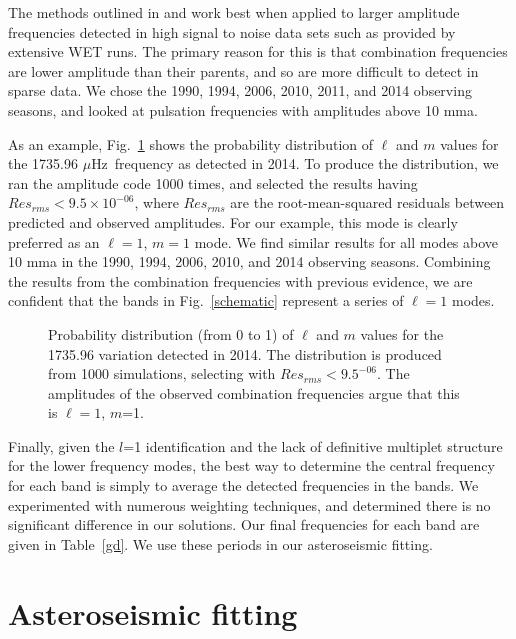 \documentclass[12pt,preprint]{aastex}
\newcommand{\muHz}{\mbox{$\mu$Hz}}
\begin{document}
The methods outlined in \citet{Provencal12} and \citet{Montgomery10} work best when applied to 
larger amplitude frequencies detected in high signal to noise data sets such as provided by 
extensive WET runs.  The primary reason for this is that combination frequencies are lower 
amplitude than their parents, and so are more difficult to detect in sparse data.  We chose 
the 1990, 1994, 2006, 2010, 2011, and 2014 observing seasons, and looked at pulsation 
frequencies with amplitudes above 10 mma.  

As an example, Fig.~\ref{modeamps} shows the probability distribution of $\ell$ and $m$ 
values for the 1735.96 \muHz\ frequency as detected in 2014. To produce the distribution, we ran
the amplitude code \citep{Montgomery10} 1000 times, and selected the results having $Res_{rms}<9.5\times10^{-06}$, 
where $Res_{rms}$ are the root-mean-squared residuals between predicted and observed amplitudes.  
For our example, this mode is clearly preferred as an $\ell=1$, $m=1$ mode. We find similar results for all
modes above 10 mma in the 1990, 1994, 2006, 2010, and 2014 observing seasons. Combining the results from the 
combination frequencies with previous evidence, we are confident that the bands in Fig.~\ref{schematic} represent
a series of $\ell=1$ modes.  

\begin{figure}
 \caption{Probability distribution (from 0 to 1) of $\ell$ and $m$ values for the 1735.96 variation detected in 
 2014.  The distribution is produced from 1000 simulations, selecting with $Res_{rms}<9.5^{-06}$. 
 The amplitudes of the observed combination frequencies argue that this is $\ell=1$, $m$=1.  
 \label{modeamps}
 }
\end{figure}


Finally, given the $l$=1 identification and the lack of definitive multiplet structure for the lower 
frequency modes, the best way to determine the central frequency for each band is simply to 
average the detected frequencies in the bands.  We experimented with numerous weighting techniques, 
and determined there is no significant difference in our solutions.  Our final frequencies for each band 
are given in Table~\ref{gd}. We use these periods in our asteroseismic fitting. 

\section{Asteroseismic fitting}
\label{fitting}
\end{document}
